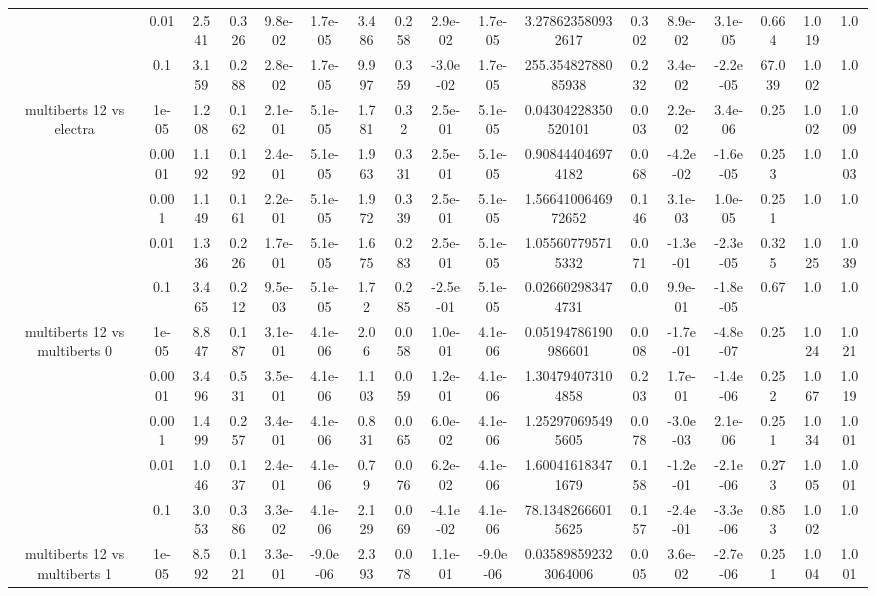 \begin{tabular}{|c|c|c|c|c|c|c|c|c|c|c|c|c|c|c|c|c|}
 & 0.01 & 2.541 & 0.326 & 9.8e-02 & 1.7e-05 & 3.486 & 0.258 & 2.9e-02 & 1.7e-05 & 3.278623580932617 & 0.302 & 8.9e-02 & 3.1e-05 & 0.664 & 1.019 & 1.0 \\
 & 0.1 & 3.159 & 0.288 & 2.8e-02 & 1.7e-05 & 9.997 & 0.359 & -3.0e-02 & 1.7e-05 & 255.35482788085938 & 0.232 & 3.4e-02 & -2.2e-05 & 67.039 & 1.002 & 1.0 \\
\hline
\multirow{5}{*}{multiberts 12 vs electra } & 1e-05 & 1.208 & 0.162 & 2.1e-01 & 5.1e-05 & 1.781 & 0.32 & 2.5e-01 & 5.1e-05 & 0.04304228350520101 & 0.003 & 2.2e-02 & 3.4e-06 & 0.25 & 1.002 & 1.009 \\
 & 0.0001 & 1.192 & 0.192 & 2.4e-01 & 5.1e-05 & 1.963 & 0.331 & 2.5e-01 & 5.1e-05 & 0.908444046974182 & 0.068 & -4.2e-02 & -1.6e-05 & 0.253 & 1.0 & 1.003 \\
 & 0.001 & 1.149 & 0.161 & 2.2e-01 & 5.1e-05 & 1.972 & 0.339 & 2.5e-01 & 5.1e-05 & 1.5664100646972652 & 0.146 & 3.1e-03 & 1.0e-05 & 0.251 & 1.0 & 1.0 \\
 & 0.01 & 1.336 & 0.226 & 1.7e-01 & 5.1e-05 & 1.675 & 0.283 & 2.5e-01 & 5.1e-05 & 1.055607795715332 & 0.071 & -1.3e-01 & -2.3e-05 & 0.325 & 1.025 & 1.039 \\
 & 0.1 & 3.465 & 0.212 & 9.5e-03 & 5.1e-05 & 1.72 & 0.285 & -2.5e-01 & 5.1e-05 & 0.026602983474731 & 0.0 & 9.9e-01 & -1.8e-05 & 0.67 & 1.0 & 1.0 \\
\hline
\multirow{5}{*}{multiberts 12 vs multiberts 0} & 1e-05 & 8.847 & 0.187 & 3.1e-01 & 4.1e-06 & 2.06 & 0.058 & 1.0e-01 & 4.1e-06 & 0.05194786190986601 & 0.008 & -1.7e-01 & -4.8e-07 & 0.25 & 1.024 & 1.021 \\
 & 0.0001 & 3.496 & 0.531 & 3.5e-01 & 4.1e-06 & 1.103 & 0.059 & 1.2e-01 & 4.1e-06 & 1.304794073104858 & 0.203 & 1.7e-01 & -1.4e-06 & 0.252 & 1.067 & 1.019 \\
 & 0.001 & 1.499 & 0.257 & 3.4e-01 & 4.1e-06 & 0.831 & 0.065 & 6.0e-02 & 4.1e-06 & 1.252970695495605 & 0.078 & -3.0e-03 & 2.1e-06 & 0.251 & 1.034 & 1.001 \\
 & 0.01 & 1.046 & 0.137 & 2.4e-01 & 4.1e-06 & 0.79 & 0.076 & 6.2e-02 & 4.1e-06 & 1.600416183471679 & 0.158 & -1.2e-01 & -2.1e-06 & 0.273 & 1.005 & 1.001 \\
 & 0.1 & 3.053 & 0.386 & 3.3e-02 & 4.1e-06 & 2.129 & 0.069 & -4.1e-02 & 4.1e-06 & 78.13482666015625 & 0.157 & -2.4e-01 & -3.3e-06 & 0.853 & 1.002 & 1.0 \\
\hline
\multirow{5}{*}{multiberts 12 vs multiberts 1} & 1e-05 & 8.592 & 0.121 & 3.3e-01 & -9.0e-06 & 2.393 & 0.078 & 1.1e-01 & -9.0e-06 & 0.035898592323064006 & 0.005 & 3.6e-02 & -2.7e-06 & 0.251 & 1.004 & 1.001 \\

\end{tabular}
